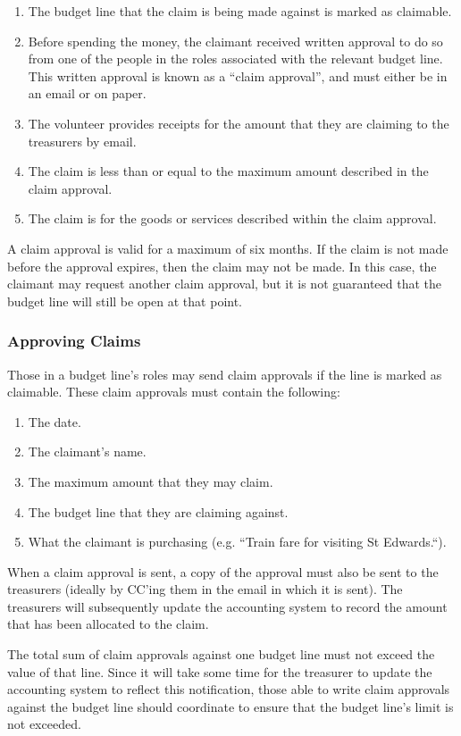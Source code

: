 \begin{enumerate}
\item The budget line that the claim is being made against is marked as claimable.
\item Before spending the money, the claimant received written approval to do so from one of the people in the roles associated with the relevant budget line.  This written approval is known as a ``claim approval'', and must either be in an email or on paper.
\item The volunteer provides receipts for the amount that they are claiming to the treasurers by email.
\item The claim is less than or equal to the maximum amount described in the claim approval.
\item The claim is for the goods or services described within the claim approval.
\end{enumerate}

A claim approval is valid for a maximum of six months.  If the claim is not made before the approval expires, then the claim may not be made.  In this case, the claimant may request another claim approval, but it is not guaranteed that the budget line will still be open at that point.

\subsubsection{Approving Claims}

Those in a budget line's roles may send claim approvals if the line is marked as claimable.  These claim approvals must contain the following:
\begin{enumerate}
\item The date.
\item The claimant's name.
\item The maximum amount that they may claim.
\item The budget line that they are claiming against.
\item What the claimant is purchasing (e.g. ``Train fare for visiting St Edwards.``).
\end{enumerate}

When a claim approval is sent, a copy of the approval must also be sent to the treasurers (ideally by CC'ing them in the email in which it is sent).  The treasurers will subsequently update the accounting system to record the amount that has been allocated to the claim.

The total sum of claim approvals against one budget line must not exceed the value of that line.  Since it will take some time for the treasurer to update the accounting system to reflect this notification, those able to write claim approvals against the budget line should coordinate to ensure that the budget line's limit is not exceeded.

